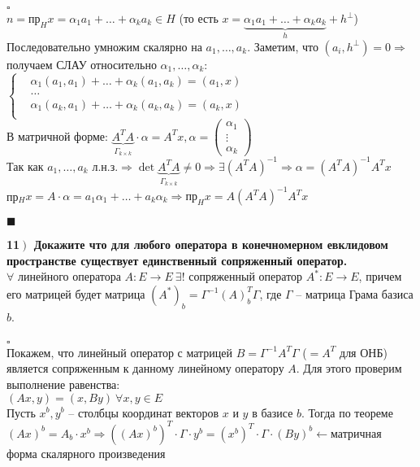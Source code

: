 \documentclass[a4paper,12pt]{article}
\begin{document}
$\square$\\
$n=\text{пр}_Hx=\alpha_1a_1+\ldots+\alpha_ka_k\in H$ (то есть $x=\underbrace{\alpha_1a_1+\ldots+\alpha_ka_k}_h+h^\perp$)\\
Последовательно умножим скалярно на $a_1, \ldots, a_k$. Заметим, что $(a_i, h^\perp)=0\Rightarrow$получаем СЛАУ относительно $\alpha_1, \ldots, \alpha_k:$\\
$\left\lbrace \begin{aligned}
&\alpha_1(a_1, a_1)+\ldots+\alpha_k(a_1, a_k)=(a_1, x)\\
&\ldots\\
&\alpha_1(a_k, a_1)+\ldots+\alpha_k(a_k, a_k)=(a_k, x)\\
\end{aligned}\right.$\\
В матричной форме: $\underbrace{A^TA}_{\Gamma_{k\times k}}\cdot\alpha=A^Tx, \alpha=\begin{pmatrix}
\alpha_1\\
\vdots\\
\alpha_k
\end{pmatrix}$\\
Так как $a_1, \ldots, a_k$ л.н.з.$\Rightarrow\det\underbrace{A^TA}_{\Gamma_{k\times k}}\ne0\Rightarrow\exists(A^TA)^{-1}\Rightarrow\alpha=(A^TA)^{-1}A^Tx$\\
пр$_Hx=A\cdot\alpha=a_1\alpha_1+\ldots+a_k\alpha_k\Rightarrow\text{пр}_Hx=A(A^TA)^{-1}A^Tx$
\begin{flushright}
	$\blacksquare$
\end{flushright}
\textbf{11$\left.\right)$ Докажите что для любого оператора в конечномерном евклидовом пространстве существует единственный сопряженный оператор.}\\
$\forall$ линейного оператора $A:E\rightarrow E\ \exists!$ сопряженный оператор $A^*:E\rightarrow E$, причем его матрицей будет матрица $(A^*)_b=\Gamma^{-1}(A)_b^T\Gamma$, где $\Gamma$ -- матрица Грама базиса $b$.\\\\
$\square$\\
Покажем, что линейный оператор с матрицей $B=\Gamma^{-1}A^T\Gamma$ ($=A^T$ для ОНБ) является сопряженным к данному линейному оператору $A$. Для этого проверим выполнение равенства:\\
$(Ax, y)=(x, By)\ \forall x, y\in E$\\
Пусть $x^b, y^b$ -- столбцы координат векторов $x$ и $y$ в базисе $b$. Тогда по теореме $(Ax)^b=A_b\cdot x^b\Rightarrow ((Ax)^b)^T\cdot\Gamma\cdot y^b=(x^b)^T\cdot\Gamma\cdot(By)^b\leftarrow$матричная форма скалярного произведения\\
\end{document}
